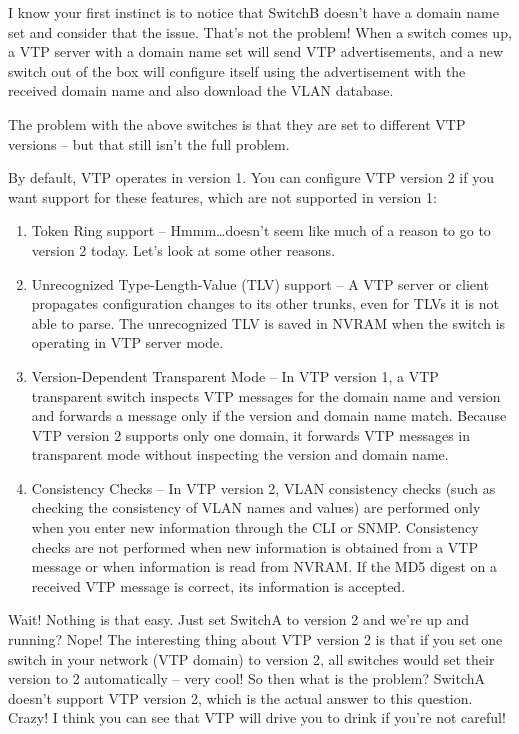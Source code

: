 I know your first instinct is to notice that SwitchB doesn't have a
domain name set and consider that the issue. That's not the problem!
When a switch comes up, a VTP server with a domain name set will send
VTP advertisements, and a new switch out of the box will configure
itself using the advertisement with the received domain name and also
download the VLAN database.

The problem with the above switches is that they are set to different
VTP versions -- but that still isn't the full problem.

By default, VTP
operates in version 1. You can configure VTP version 2 if you want
support for these features, which are not supported in version 1:

\begin{enumerate}
\tightlist
\item
  Token Ring support -- Hmmm\ldots doesn't seem like much of a reason to
  go to version 2 today. Let's look at some other reasons.
\item
  Unrecognized Type-Length-Value (TLV) support -- A VTP server or client
  propagates configuration changes to its other trunks, even for TLVs it
  is not able to parse. The unrecognized TLV is saved in NVRAM when the
  switch is operating in VTP server mode.
\item
  Version-Dependent Transparent Mode -- In VTP version 1, a VTP
  transparent switch inspects VTP messages for the domain name and
  version and forwards a message only if the version and domain name
  match. Because VTP version 2 supports only one domain, it forwards VTP
  messages in transparent mode without inspecting the version and domain
  name.
\item
  Consistency Checks -- In VTP version 2, VLAN consistency checks (such
  as checking the consistency of VLAN names and values) are performed
  only when you enter new information through the CLI or SNMP.
  Consistency checks are not performed when new information is obtained
  from a VTP message or when information is read from NVRAM. If the MD5
  digest on a received VTP message is correct, its information is
  accepted.
\end{enumerate}

Wait! Nothing is that easy. Just set SwitchA to version 2 and we're up
and running? Nope! The interesting thing about VTP version 2 is that if
you set one switch in your network (VTP domain) to version 2, all
switches would set their version to 2 automatically -- very cool! So then
what is the problem? SwitchA doesn't support VTP version 2, which is the
actual answer to this question. Crazy! I think you can see that VTP will
drive you to drink if you're not careful!

